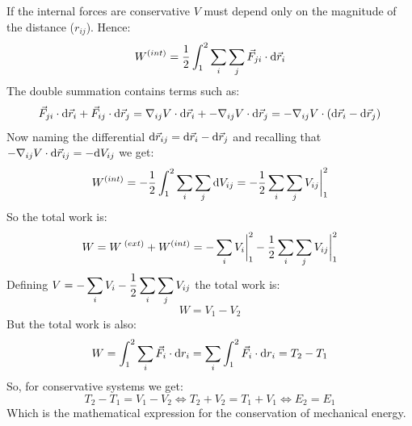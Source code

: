 If the internal forces are conservative $V$ must depend only on the magnitude of the distance ($r_{ij}$). Hence:
\begin{equation}
    W^{(int)}=\dfrac{1}{2}\int_{1}^{2}\displaystyle\sum_i\displaystyle\sum_j\vec{F}_{ji}\cdot\mathrm{d}\vec{r}_i
\end{equation}
The double summation contains terms such as:
\begin{equation}
    \vec{F}_{ji}\cdot\mathrm{d}\vec{r}_i + \vec{F}_{ij}\cdot\mathrm{d}\vec{r}_j = \nabla_{ij}V\cdot\mathrm{d}\vec{r}_i + -\nabla_{ij}V\cdot\mathrm{d}\vec{r}_j = -\nabla_{ij}V\cdot\left(\mathrm{d}\vec{r}_i-\mathrm{d}\vec{r}_j\right)
\end{equation}
Now naming the differential $\mathrm{d}\vec{r}_{ij}=\mathrm{d}\vec{r}_i-\mathrm{d}\vec{r}_j$ and recalling that $-\nabla_{ij}V\cdot\mathrm{d}\vec{r}_{ij} = -\mathrm{d}V_{ij}$ we get:
\begin{equation}
    W^{(int)}=-\dfrac{1}{2}\int_{1}^{2}\displaystyle\sum_i\displaystyle\sum_j\mathrm{d}V_{ij} = -\dfrac{1}{2}\displaystyle\sum_i\displaystyle\sum_j V_{ij}\bigg|_{1}^{2}
\end{equation}
So the total work is:
\begin{equation}
    W = W^{\;(ext)}+W^{(int)}= -\displaystyle\sum_i V_i\bigg|_{1}^{2} -\dfrac{1}{2}\displaystyle\sum_i\displaystyle\sum_j V_{ij}\bigg|_{1}^{2}
\end{equation}
Defining $V=-\displaystyle\sum_i V_i -\dfrac{1}{2}\displaystyle\sum_i\displaystyle\sum_j V_{ij}$ the total work is:
\begin{equation}
    W = V_1-V_2
\end{equation}
But the total work is also:
\begin{equation}
    W = \int_{1}^{2}\displaystyle\sum_i \vec{F}_i \cdot \mathrm{d}r_i= \displaystyle\sum_i \int_{1}^{2} \vec{F}_i \cdot \mathrm{d}r_i = T_2 - T_1
\end{equation}
So, for conservative systems we get:
\begin{equation}
    T_2 - T_1 = V_1 - V_2 \iff T_2 + V_2 = T_1 + V_1 \iff E_2 = E_1
\end{equation}
Which is the mathematical expression for the conservation of mechanical energy.
